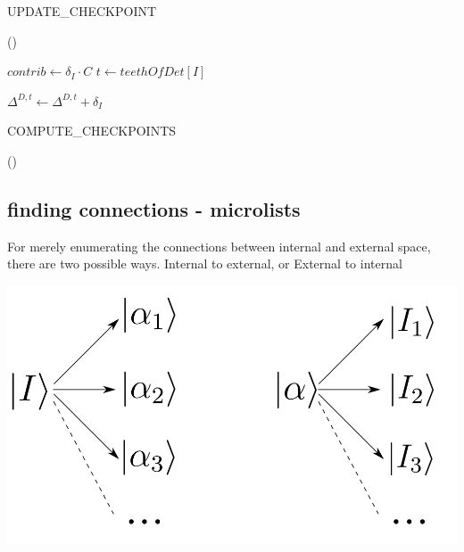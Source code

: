 \begin{algorithm}
	\label{UPDATE_CHECKPOINT}
	\caption{UPDATE\_CHECKPOINT}
		
	
		\Fn(){\FUpdateCheckpoints{}}{
			$contrib \gets \delta_I \cdot C$ \;
			$t \gets teethOfDet[I]$ \;

			

				$\Delta^{D,t} \gets \Delta^{D,t} + \delta_I$ \;

		}
		
\end{algorithm}
\begin{algorithm}
	\label{COMPUTE_CHECKPOINTS}
	\caption{COMPUTE\_CHECKPOINTS}
		
	
		\Fn(){}{
		}
\end{algorithm}



\subsection{finding connections - microlists}

For merely enumerating the connections between internal and external space, there are two possible ways.
Internal to external, or External to internal
	\begin{center}
		\includegraphics[width=0.5\columnwidth]{figures/matrix_dressing/interactions}
	\end{center}

